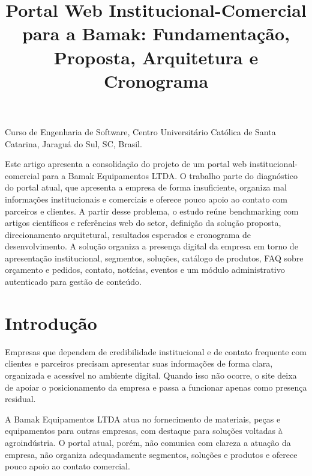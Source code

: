 \documentclass[portuguese]{sbcreviews-2025}
\title[Portal Web da Bamak]{Portal Web Institucional-Comercial para a Bamak: Fundamentação, Proposta, Arquitetura e Cronograma}
\author[Bauer]{
\affil{\textbf{Bredley Bauer}~\textcolor{blue}{\faEnvelope}~~[Centro Universitário Católica de Santa Catarina~|~\href{mailto:bredley.bauer@catolicasc.edu.br}{\textit{bredley.bauer@catolicasc.edu.br}}]}
}
\begin{document}
\begin{frontmatter}

\maketitle

\begin{mail}
Curso de Engenharia de Software, Centro Universitário Católica de Santa Catarina, Jaraguá do Sul, SC, Brasil.
\end{mail}

\begin{abstract-pt}
Este artigo apresenta a consolidação do projeto de um portal web institucional-comercial para a Bamak Equipamentos LTDA. O trabalho parte do diagnóstico do portal atual, que apresenta a empresa de forma insuficiente, organiza mal informações institucionais e comerciais e oferece pouco apoio ao contato com parceiros e clientes. A partir desse problema, o estudo reúne benchmarking com artigos científicos e referências web do setor, definição da solução proposta, direcionamento arquitetural, resultados esperados e cronograma de desenvolvimento. A solução organiza a presença digital da empresa em torno de apresentação institucional, segmentos, soluções, catálogo de produtos, FAQ sobre orçamento e pedidos, contato, notícias, eventos e um módulo administrativo autenticado para gestão de conteúdo.
\vspace{0.8cm}
\end{abstract-pt}

\end{frontmatter}

\section{Introdução}

Empresas que dependem de credibilidade institucional e de contato frequente com clientes e parceiros precisam apresentar suas informações de forma clara, organizada e acessível no ambiente digital. Quando isso não ocorre, o site deixa de apoiar o posicionamento da empresa e passa a funcionar apenas como presença residual.

A Bamak Equipamentos LTDA atua no fornecimento de materiais, peças e equipamentos para outras empresas, com destaque para soluções voltadas à agroindústria. O portal atual, porém, não comunica com clareza a atuação da empresa, não organiza adequadamente segmentos, soluções e produtos e oferece pouco apoio ao contato comercial.
\end{document}
